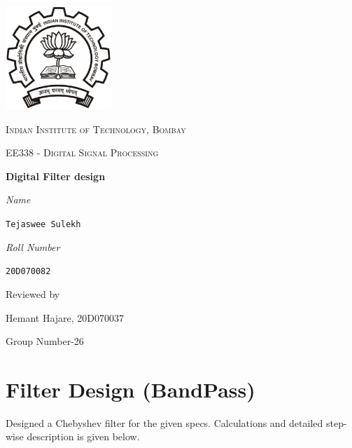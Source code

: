 \documentclass{scrartcl}
\begin{document}
\begin{titlepage}
	\centering
	\includegraphics[width=0.3\textwidth]{LOGO.PNG}\par\vspace{1cm} %
	{\scshape\LARGE Indian Institute of Technology, Bombay \par} %
	\vspace{1cm}
	{\scshape\Large EE338 - Digital Signal Processing \par} %
	\vspace{1.5cm}
	{\huge\bfseries Digital Filter design\par} %
	\vspace{2cm}
	{\Large\itshape Name}\par %
	\texttt{Tejaswee Sulekh}\par %
	\vspace{0.7cm}
	{\Large\itshape Roll Number}\par %
	\texttt{20D070082}\par %
	\vfill
	Reviewed by\par %
	   Hemant Hajare, 20D070037 %
	\vfill

	{\large Group Number-26\par}
\end{titlepage}


\section{Filter Design (BandPass)} %

Designed a Chebyshev filter for the given specs. Calculations and detailed step-wise description is given below.
\end{document}
